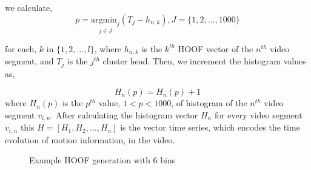 we calculate,
\begin{equation}
p = \underset{j\in J}{\mathrm{argmin}_{j}}(T_{j}-h_{n,k}), J=\{1,2,\dots,1000\}
\end{equation}

for each, $k$ in $\{1,2,\dots, l\}$, where $h_{n,k}$ is the $k^{th}$ HOOF vector of the $n^{th}$ video segment, and $T_{j}$ is the $j^{th}$ cluster head. Then,
we increment the histogram values as,

\begin{equation}
H_{n}(p) = H_{n}(p)+1
\end{equation}
where $H_{n}(p)$ is the $p^{th}$ value, $1<p<1000$, of histogram of the $n^{th}$ video segment $v_{i,n}$. After calculating the histogram vector $H_{n}$ for every video segment $v_{i,n}$
this $H = [H_{1},H_{2}, \dots, H_{n}]$ is the vector time series, which encodes the time evolution of motion information, in the video.

\begin{figure}
  \centering
  
  \caption{Example HOOF generation with 6 bins}\label{fi:hoof}
\end{figure}
